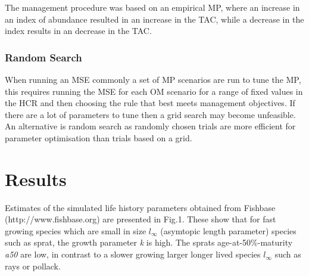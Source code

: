 \documentclass[preprint,12pt]{elsarticle}
\begin{document}
The management procedure was based on an empirical MP, where an increase in an index of abundance resulted in an increase in the TAC, while a decrease in the index results in an decrease in the TAC.

\subsubsection{Random Search}


When running an MSE commonly a set of MP scenarios are run to tune the MP, this requires running the MSE for each OM scenario for a range of fixed values in the HCR and then choosing the rule that best meets management objectives. If there are a lot of parameters to tune then a grid search may become unfeasible. An alternative is random search \cite{bergstra2012random} as randomly chosen trials are more efficient for parameter optimisation than trials based on a grid. 

  
\section{Results}

Estimates of the simulated life history parameters obtained from Fishbase (http://www.fishbase.org) are presented in Fig.1. These show that for fast growing species which are small in size $l_{\infty}$ (asymtopic length parameter) species such as sprat, the growth parameter \textit{k} is high. The sprats age-at-50\%-maturity \textit{a50} are low, in contrast to a slower growing larger longer lived species $l_{\infty}$ such as rays or pollack.
\end{document}
